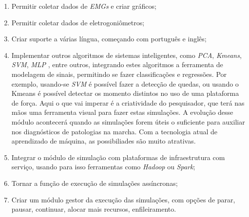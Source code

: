 \begin{enumerate}
	\item Permitir coletar dados de \emph{EMGs} e criar gráficos;
	\item Permitir coletar dados de eletrogoniômetros;
	\item Criar suporte a várias língua, começando com português e inglês;
	\item Implementar outros algoritmos de sistemas inteligentes, como \emph{PCA}, \emph{Kmeans}, \emph{SVM}, \emph{MLP} \cite{Haykin1998}, entre outros, integrando estes algoritmos a ferramenta de modelagem de sinais, permitindo se fazer classificações e regressões. 
Por exemplo, usando-se \emph{SVM} é possível fazer a detecção de quedas, ou usando o Kmeans é possível detectar os momento distintos no uso de uma plataforma de força. 
Aqui o que vai imperar é a criatividade do pesquisador, que terá nas mãos uma ferramenta visual para fazer estas simulações. 
A evolução desse módulo acontecerá quando as simulações forem úteis o suficiente para auxiliar nos diagnósticos de patologias na marcha. 
Com a tecnologia atual de aprendizado de máquina, as possibiliades são muito atrativas.
	\item Integrar o módulo de simulação com plataformas de infraestrutura com serviço, usando para isso ferramentas como \emph{Hadoop} ou \emph{Spark};
	\item Tornar a função de execução de simulações assíncronas;
	\item Criar um módulo gestor da execução das simulações, com opções de parar, pausar, continuar, alocar mais recursos, enfileiramento.
\end{enumerate}

